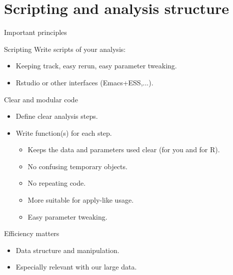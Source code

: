 \documentclass[10pt]{beamer}
\begin{document}
\section{Scripting and analysis structure}

\begin{frame}{Important principles}
  \begin{block}{Scripting}
    Write scripts of your analysis: 
    \begin{itemize}
    \item Keeping track, easy rerun, easy parameter tweaking.
    \item {\sf Rstudio} or other interfaces ({\sf Emacs+ESS},...).
    \end{itemize}
  \end{block}
  \begin{block}{Clear and modular code}
    \begin{itemize}
    \item Define clear analysis steps.
    \item Write function(s) for each step.
      \begin{itemize}
      \item Keeps the data and parameters used clear (for you and for R).
      \item No confusing temporary objects.
      \item No repeating code.
      \item More suitable for {\sf apply}-like usage.
      \item Easy parameter tweaking.
      \end{itemize}
    \end{itemize}
  \end{block}
  \begin{block}{Efficiency matters}
    \begin{itemize}
    \item Data structure and manipulation.
    \item Especially relevant with our large data.
    \end{itemize}

  \end{block}
\end{frame}
\end{document}
